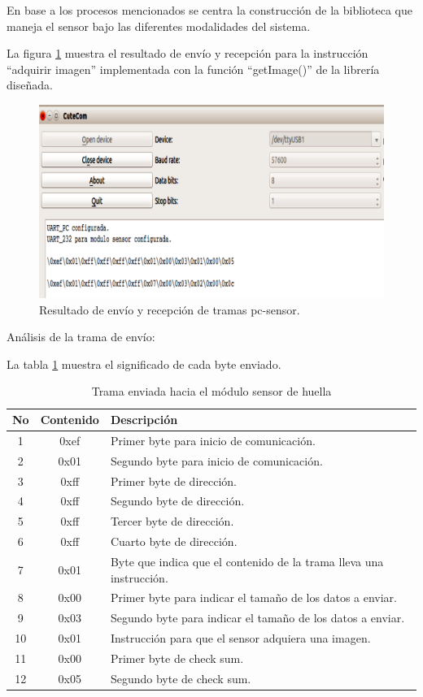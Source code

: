 En base a los procesos mencionados se centra la construcción de la biblioteca que maneja el sensor bajo las diferentes modalidades del sistema.

La figura \ref{fig:comsen} muestra el resultado de envío y recepción para la instrucción “adquirir imagen” implementada con la función “getImage()” de la librería diseñada.

\begin{figure}[h]
	\centering
	\includegraphics[scale =.3]{./Figures/comsen.png}
	\caption{Resultado de envío y recepción de tramas pc-sensor.}
	\label{fig:comsen}
\end{figure}

Análisis de la trama de envío:

La tabla \ref{tab:tramaenvio} muestra el significado de cada byte enviado.

\begin{table}[h]
	\centering
	\caption[Resultado trama de envío]{Trama enviada hacia el módulo sensor de huella}
	\begin{tabular}{c c l}    
		\toprule
		\textbf{No}  & \textbf{Contenido}  & \textbf{Descripción}\\
		\midrule
		1	 	& 0xef 	& Primer byte para inicio de comunicación.\\		
		2	 	& 0x01 	& Segundo byte para inicio de comunicación.\\
		3 		& 0xff & Primer byte de dirección.\\	
		4	 	& 0xff 	& Segundo byte de dirección.\\
		5	 	& 0xff 	& Tercer byte de dirección.\\
		6	 	& 0xff 	& Cuarto byte de dirección.\\
		7	 	& 0x01 	& Byte que indica que el contenido de la trama lleva una instrucción.\\
		8	 	& 0x00 	& Primer byte para indicar el tamaño de los datos a enviar.\\				
		9	 	& 0x03 	& Segundo byte para indicar el tamaño de los datos a enviar.\\	
		10	 	& 0x01 	& Instrucción para que el sensor adquiera una imagen.\\	
		11	 	& 0x00 	& Primer byte de check sum.\\	
		12	 	& 0x05 	& Segundo byte de check sum.\\				
		\bottomrule
		\hline
	\end{tabular}
	\label{tab:tramaenvio}
\end{table}

